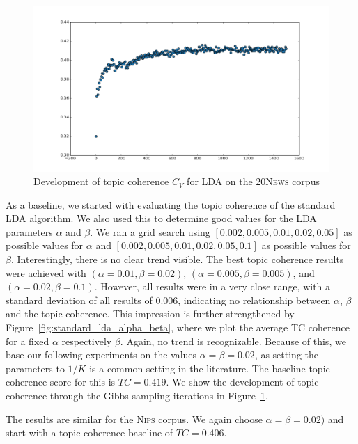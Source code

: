 \documentclass[
        a4paper,
        titlepage,
        twoside,
        parskip
        ]{scrbook}
\theoremstyle{break}
\begin{document}
\begin{figure}
       \centering
       \includegraphics[width=\textwidth]{figures/lda_20news_tc_development.png}
       \caption{Development of topic coherence $C_V$ for LDA on the \textsc{20News} corpus}
       \label{fig:lda_20news_tc_development}
\end{figure}
As a baseline, we started with evaluating the topic coherence of the standard LDA algorithm.
We also used this to determine good values for the LDA parameters $\alpha$ and $\beta$.
We ran a grid search using $[0.002, 0.005, 0.01, 0.02, 0.05]$ as possible values for $\alpha$ and $[0.002, 0.005, 0.01, 0.02, 0.05, 0.1]$ as possible values for $\beta$.
Interestingly, there is no clear trend visible.
The best topic coherence results were achieved with $(\alpha=0.01,\beta=0.02)$, $(\alpha=0.005,\beta=0.005)$, and $(\alpha=0.02,\beta=0.1)$.
However, all results were in a very close range, with a standard deviation of all results of $0.006$, indicating no relationship between $\alpha$, $\beta$ and the topic coherence.
This impression is further strengthened by Figure~\ref{fig:standard_lda_alpha_beta}, where we plot the average TC coherence for a fixed $\alpha$ respectively $\beta$.
Again, no trend is recognizable.
Because of this, we base our following experiments on the values $\alpha = \beta = 0.02$, as setting the parameters to $1/K$ is a common setting in the literature.
The baseline topic coherence score for this is $TC = 0.419$.
We show the development of topic coherence through the Gibbs sampling iterations in Figure~\ref{fig:lda_20news_tc_development}.

The results are similar for the \textsc{Nips} corpus.
We again choose $\alpha = \beta = 0.02)$ and start with a topic coherence baseline of $TC = 0.406$.
\end{document}
